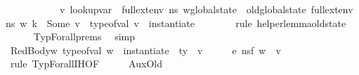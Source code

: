\begin{isabellebody}
\ \ \ \ \ \ \ \ \ \ \ {\isacharparenleft}{\kern0pt}{\isasymexists}v{\isachardot}{\kern0pt}\ lookup{\isacharunderscore}{\kern0pt}var\ {\isasymLambda}\ {\isacharparenleft}{\kern0pt}{\isacharparenleft}{\kern0pt}full{\isacharunderscore}{\kern0pt}ext{\isacharunderscore}{\kern0pt}env\ n{\isacharunderscore}{\kern0pt}s\ w{\isacharparenright}{\kern0pt}{\isasymlparr}global{\isacharunderscore}{\kern0pt}state\ {\isacharcolon}{\kern0pt}{\isacharequal}{\kern0pt}\ old{\isacharunderscore}{\kern0pt}global{\isacharunderscore}{\kern0pt}state\ {\isacharparenleft}{\kern0pt}full{\isacharunderscore}{\kern0pt}ext{\isacharunderscore}{\kern0pt}env\ n{\isacharunderscore}{\kern0pt}s\ w{\isacharparenright}{\kern0pt}{\isasymrparr}{\isacharparenright}{\kern0pt}\ k\ {\isacharequal}{\kern0pt}\ Some\ v\ {\isasymand}\ type{\isacharunderscore}{\kern0pt}of{\isacharunderscore}{\kern0pt}val\ v\ {\isacharequal}{\kern0pt}\ instantiate\ {\isasymOmega}\ {\isasymtau}{\isacharprime}{\kern0pt}{\isacharparenright}{\kern0pt}{\isachardoublequoteclose}\isanewline
\ \ \ \ \isamarkupfalse%
\ {\isacharparenleft}{\kern0pt}rule\ helper{\isacharunderscore}{\kern0pt}lemma{\isacharunderscore}{\kern0pt}old{\isacharunderscore}{\kern0pt}state{\isacharparenright}{\kern0pt}\isanewline
\ \ \ \ \isamarkupfalse%
\ TypForall{\isachardot}{\kern0pt}prems{\isacharparenleft}{\kern0pt}{}{\isacharparenright}{\kern0pt}\ \isamarkupfalse%
\ simp\isanewline
\ \ \ \ \isamarkupfalse%
\isanewline
\ \ \isamarkupfalse%
\ RedBody{\isacharcolon}{\kern0pt}{\isachardoublequoteopen}{\isasymAnd}w{\isachardot}{\kern0pt}\ type{\isacharunderscore}{\kern0pt}of{\isacharunderscore}{\kern0pt}val\ w\ {\isacharequal}{\kern0pt}\ instantiate\ {\isasymOmega}\ ty\ {\isasymLongrightarrow}\ {\isasymexists}v{\isacharprime}{\kern0pt}{\isachardot}{\kern0pt}\ \ {\isasymLambda}{\isacharcomma}{\kern0pt}\ {\isasymGamma}{\isacharcomma}{\kern0pt}\ {\isasymOmega}\ {\isasymturnstile}\ {\isasymlangle}e{\isacharcomma}{\kern0pt}\ {\isacharquery}{\kern0pt}ns{\isacharprime}{\kern0pt}f\ w{\isasymrangle}\ {\isasymDown}\ v{\isacharprime}{\kern0pt}{\isachardoublequoteclose}\ \isanewline
\ \ \ \ \isamarkupfalse%
\ {\isacharparenleft}{\kern0pt}rule\ TypForall{\isachardot}{\kern0pt}IH{\isacharparenleft}{\kern0pt}{}{\isacharparenright}{\kern0pt}{\isacharbrackleft}{\kern0pt}OF\ {\isacharunderscore}{\kern0pt}\ {\isacharunderscore}{\kern0pt}\ {\isacharunderscore}{\kern0pt}\ {\isacharunderscore}{\kern0pt}\ {\isacharunderscore}{\kern0pt}\ AuxOld{\isacharbrackright}{\kern0pt}{\isacharparenright}{\kern0pt}\isanewline

\end{isabellebody}
